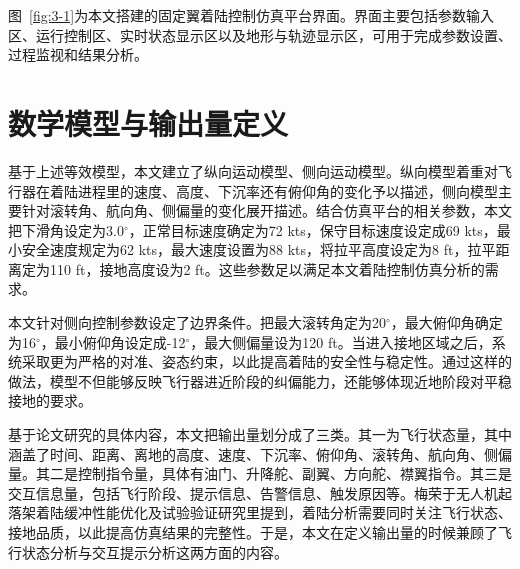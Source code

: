 图~\ref{fig:3-1}为本文搭建的固定翼着陆控制仿真平台界面。界面主要包括参数输入区、运行控制区、实时状态显示区以及地形与轨迹显示区，可用于完成参数设置、过程监视和结果分析。

\section{数学模型与输出量定义}

基于上述等效模型，本文建立了纵向运动模型、侧向运动模型。纵向模型着重对飞行器在着陆进程里的速度、高度、下沉率还有俯仰角的变化予以描述，侧向模型主要针对滚转角、航向角、侧偏量的变化展开描述。结合仿真平台的相关参数，本文把下滑角设定为3.0$^\circ$，正常目标速度确定为72
kts，保守目标速度设定成69 kts，最小安全速度规定为62
kts，最大速度设置为88 kts，将拉平高度设定为8 ft，拉平距离定为110
ft，接地高度设为2 ft。这些参数足以满足本文着陆控制仿真分析的需求。

本文针对侧向控制参数设定了边界条件。把最大滚转角定为20$^\circ$，最大俯仰角确定为16$^\circ$，最小俯仰角设定成-12$^\circ$，最大侧偏量设为120
ft。当进入接地区域之后，系统采取更为严格的对准、姿态约束，以此提高着陆的安全性与稳定性。通过这样的做法，模型不但能够反映飞行器进近阶段的纠偏能力，还能够体现近地阶段对平稳接地的要求。

基于论文研究的具体内容，本文把输出量划分成了三类。其一为飞行状态量，其中涵盖了时间、距离、离地的高度、速度、下沉率、俯仰角、滚转角、航向角、侧偏量。其二是控制指令量，具体有油门、升降舵、副翼、方向舵、襟翼指令。其三是交互信息量，包括飞行阶段、提示信息、告警信息、触发原因等。梅荣于无人机起落架着陆缓冲性能优化及试验验证研究里提到，着陆分析需要同时关注飞行状态、接地品质，以此提高仿真结果的完整性。于是，本文在定义输出量的时候兼顾了飞行状态分析与交互提示分析这两方面的内容。

